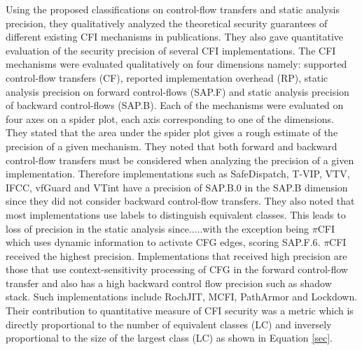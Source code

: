 \documentclass[dvips,12pt]{article}
\begin{document}
Using the proposed classifications on control-flow transfers and static analysis precision, they qualitatively analyzed the theoretical security guarantees of different existing CFI mechanisms in publications. They also gave quantitative evaluation of the security precision of several CFI implementations. The CFI mechanisms were evaluated qualitatively on four dimensions namely: supported control-flow transfers (CF), reported implementation overhead (RP), static analysis precision on forward control-flows (SAP.F) and static analysis precision of backward control-flows (SAP.B). Each of the mechanisms were evaluated on four axes on a spider plot, each axis corresponding to one of the dimensions. They stated that the area under the spider plot gives a rough estimate of the precision of a given mechanism. They noted that both forward and backward control-flow transfers must be considered when analyzing the precision of a given implementation. Therefore implementations such as SafeDispatch, T-VIP, VTV, IFCC, vfGuard and VTint have a precision of SAP.B.0 in the SAP.B dimension since they did not consider backward control-flow transfers. They also noted that most implementations use labels to distinguish equivalent classes. This leads to loss of precision in the static analysis since.....with the exception being $\pi$CFI which uses dynamic information to activate CFG edges, scoring SAP.F.6. $\pi$CFI received the highest precision. Implementations that received high precision are those that use context-sensitivity processing of CFG in the forward control-flow transfer and also has a high backward control flow precision such as shadow stack. Such implementations include RochJIT, MCFI, PathArmor and Lockdown. Their contribution to quantitative measure of CFI security was a metric which is directly proportional to the number of equivalent classes (LC) and inversely proportional to the size of the largest class (LC) as shown in Equation \ref{sec}. 
\end{document}
